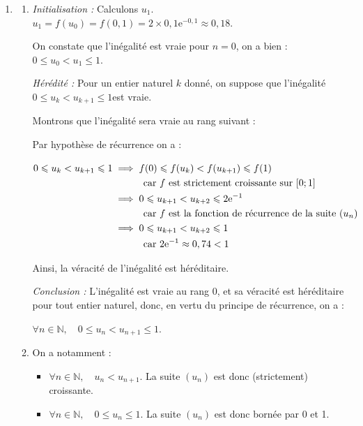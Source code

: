 \documentclass[10pt]{article}
\providecommand{\N}{\mathbb{N}}
\providecommand{\e}{{\mathrm{e}}}
\begin{document}
\begin{enumerate}
		\item 
		\begin{enumerate}
			\item \emph{Initialisation :} Calculons $u_1$. $u_1 = f(u_0) = f(0,1) = 2\times 0,1\e^{-0,1} \approx 0,18$.

On constate que l'inégalité est vraie pour $n = 0$, on a bien : \quad $ 0\leqslant u_0 < u_1 \leqslant 1$.

\smallskip

\emph{Hérédité :} Pour un entier naturel $k$ donné, on suppose que l'inégalité \quad $ 0\leqslant u_k < u_{k+1} \leqslant 1$\quad est vraie.

Montrons que l'inégalité sera vraie au rang suivant :

Par hypothèse de récurrence on a :

$ \begin{aligned}[t] 0\leqslant u_k < u_{k+1} \leqslant 1
&\implies f(0) \leqslant f(u_k) < f(u_{k+1}) \leqslant f(1)\\
&\hphantom{\implies}\quad \text{car $f$ est strictement croissante sur }[0 ; 1]\\
&\implies 0 \leqslant u_{k+1 } < u_{k+2} \leqslant 2\e^{-1}\\
&\hphantom{\implies}\quad \text{car $f$ est la fonction de récurrence de la suite  } (u_n)\\
&\implies 0 \leqslant u_{k+1 } < u_{k+2} \leqslant 1\\
&\hphantom{\implies}\quad \text{car } 2\e^{-1} \approx 0,74 < 1\\		\end{aligned}$


Ainsi, la véracité de l'inégalité est héréditaire.

\smallskip

\emph{Conclusion :} L'inégalité est vraie au rang 0, et sa véracité est héréditaire pour tout entier naturel, donc, en vertu du principe de récurrence, on a :

$\forall n \in \N,\quad 0 \leqslant u_{n} < u_{n+1} \leqslant 1$.

		\item On a notamment :
\begin{itemize}
\item $\forall n \in \N,\quad u_{n} < u_{n+1}$. \quad La suite $(u_n)$ est donc (strictement) croissante.
\item $\forall n \in \N,\quad 0 \leqslant u_{n}\leqslant 1$. \quad La suite $(u_n)$ est donc bornée par 0 et 1.
\end{itemize}


\end{enumerate}
\end{enumerate}
\end{document}
